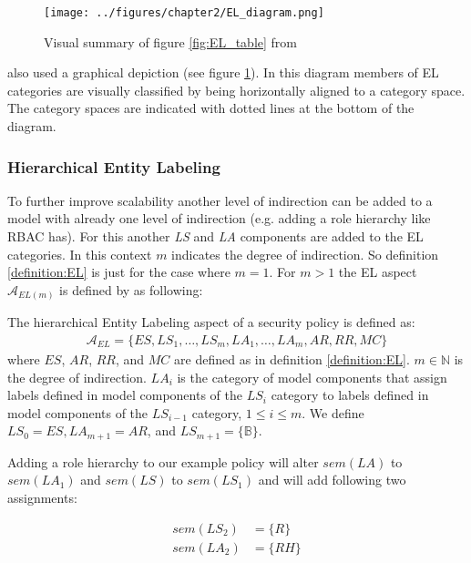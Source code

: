\documentclass[twoside, openright, 12pt]{book}
\begin{document}
\begin{figure}[htb]
	\centering
	\texttt{[image: ../figures/chapter2/EL\_diagram.png]}
	\caption{Visual summary of figure \ref{fig:EL_table} from \cite[p.76, figure 4.3]{Amthor18}}
	\label{fig:EL_diagram}
\end{figure}

\cite{Amthor18} also used a graphical depiction (see figure \ref{fig:EL_diagram}).
In this diagram members of EL categories are visually classified by being horizontally aligned to a category space.
The category spaces are indicated with dotted lines at the bottom of the diagram.

\subsubsection{Hierarchical Entity Labeling}
To further improve scalability another level of indirection can be added to a model with already one level of indirection (e.g. adding a role hierarchy like RBAC has).
For this another \textit{LS} and \textit{LA} components are added to the EL categories.
In this context $m$ indicates the degree of indirection.
So definition \ref{definition:EL} is just for the case where $m=1$.
For $m>1$ the EL aspect $\mathcal{A}_{EL(m)}$ is defined by \cite{Amthor18} as following:

\begin{xdefinition} 
The hierarchical Entity Labeling aspect of a security policy is defined as:
\begin{gather*}
\mathcal{A}_{EL} = \lbrace ES,LS_1, \dots,LS_m, LA_1, \dots, LA_m,AR,RR,MC\rbrace
\end{gather*}
where $ES$, $AR$, $RR$, and $MC$ are defined as in definition \ref{definition:EL}.
$m \in \mathbb{N}$ is the degree of indirection. 
$LA_i$ is the category of model components that assign labels defined in model components of the $LS_i$ category to labels defined in model components of the $LS_{i-1}$ category, $1 \leq i \leq m$.
We define $LS_0 = ES, LA_{m+1}=AR$, and $LS_{m+1} = \lbrace \mathbb{B} \rbrace$.
\label{definition:EL_m}
\end{xdefinition}

\noindent
Adding a role hierarchy to our example policy will alter $sem(LA)$ to $sem(LA_1)$ and $sem(LS)$ to $sem(LS_1)$ and will add following two assignments:

\begin{align*}
sem(LS_2) &= \lbrace R \rbrace\\
sem(LA_2) &= \lbrace RH \rbrace\\
\end{align*}
\end{document}
